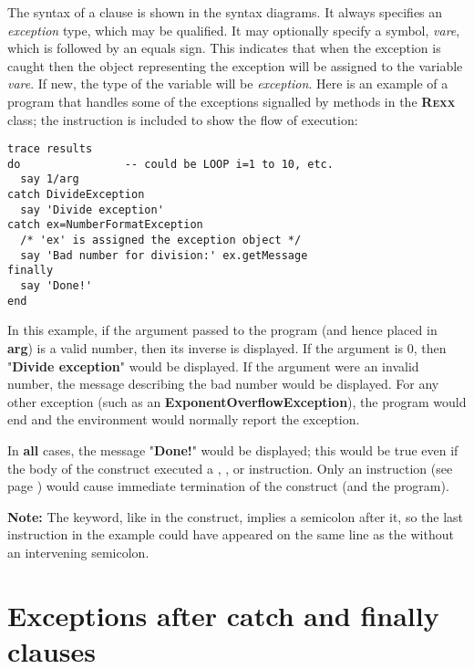 The syntax of a  clause is shown in the syntax diagrams.
It always specifies an \emph{exception} type, which may be
qualified.  It may optionally specify a symbol, \emph{vare}, which
is followed by an equals sign.  This indicates that when the exception
is caught then the object representing the exception will be assigned to
the variable \emph{vare}.  If new, the type of the variable will be
\emph{exception}.
 Here is an example of a program that handles some of the exceptions
signalled by methods in the \textbf{R\textsc{exx}} class; the  instruction is included to show the flow of execution:
\begin{lstlisting}
trace results
do                -- could be LOOP i=1 to 10, etc.
  say 1/arg
catch DivideException
  say 'Divide exception'
catch ex=NumberFormatException
  /* 'ex' is assigned the exception object */
  say 'Bad number for division:' ex.getMessage
finally
  say 'Done!'
end
\end{lstlisting}
In this example, if the argument passed to the program (and hence
placed in \textbf{arg}) is a valid number, then its inverse is
displayed.  If the argument is 0, then "\textbf{Divide
exception}" would be displayed.  If the argument were an invalid
number, the message describing the bad number would be displayed.
For any other exception (such as an \textbf{ExponentOverflowException}),
the program would end and the environment would normally report the
exception.
 
In \textbf{all} cases, the message "\textbf{Done!}" would be
displayed; this would be true even if the body of the 
construct executed a , , or
 instruction.  Only an   instruction (see page \pageref{refexit}) would cause immediate termination of the construct (and
the program).
\begin{shaded}\noindent
\textbf{Note: }The  keyword, like  in the
 construct, implies a semicolon after it, so the last
 instruction in the example could have appeared on the same
line as the  without an intervening semicolon.
\end{shaded}\indent
\section{Exceptions after catch and finally clauses}
 
